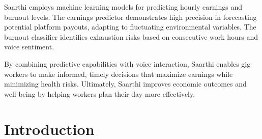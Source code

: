 \documentclass[12pt,a4paper]{article}
\begin{document}
\vspace{0.5cm}

\par\noindent
Saarthi employs machine learning models for predicting hourly earnings and burnout levels. The earnings predictor demonstrates high precision in forecasting potential platform payouts, adapting to fluctuating environmental variables. The burnout classifier identifies exhaustion risks based on consecutive work hours and voice sentiment.

\vspace{0.5cm}

\par\noindent
By combining predictive capabilities with voice interaction, Saarthi enables gig workers to make informed, timely decisions that maximize earnings while minimizing health risks. Ultimately, Saarthi improves economic outcomes and well-being by helping workers plan their day more effectively.

\vspace{0.5cm}



\newpage
\tableofcontents

\newpage
{}
\section{Introduction}
\end{document}
